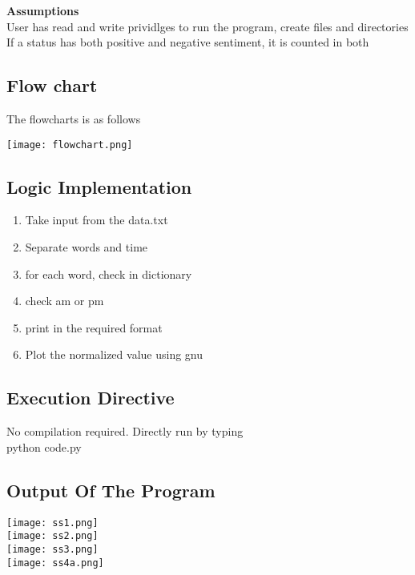 \documentclass[paper=a4, fontsize=11pt]{scrartcl} %
\numberwithin{equation}{section} %
\numberwithin{figure}{section} %
\numberwithin{table}{section} %
\begin{document}
{\textbf{Assumptions}}\\
User has read and write prividlges to run the program, create files and directories\\
If a  status has both positive and negative sentiment, it is counted in both\\


\subsection{Flow chart}
The flowcharts is as follows

 {\center\texttt{[image: flowchart.png]}}\\
\newpage


\subsection{Logic Implementation}
\begin {enumerate}
\item	Take input from the data.txt
\item	Separate words and time
\item	for each word, check in dictionary 
\item check am or pm
\item	 print in the required format
\item    Plot the normalized value using gnu
\end{enumerate}

\subsection{Execution Directive}
No compilation required. Directly run by typing\\

python code.py\\

\subsection{Output Of The Program}
\texttt{[image: ss1.png]}\\

\texttt{[image: ss2.png]}\\

\texttt{[image: ss3.png]}\\

\texttt{[image: ss4a.png]}\\
\end{document}
